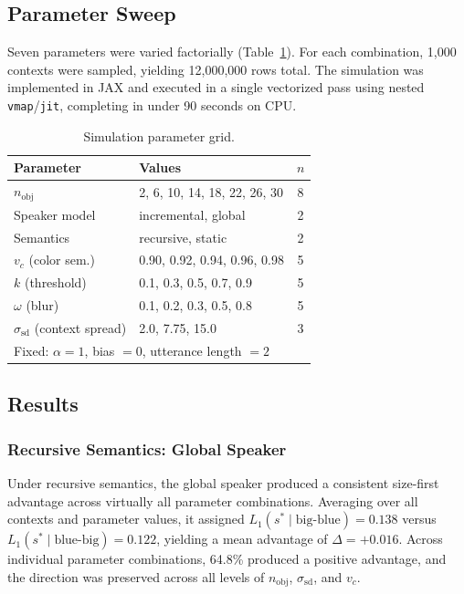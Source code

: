 \subsection{Parameter Sweep}

Seven parameters were varied factorially (Table~\ref{tab:params}).
For each combination, 1{,}000 contexts were sampled, yielding
12{,}000{,}000 rows total.
The simulation was implemented in JAX \citep{jax2018github} and executed
in a single vectorized pass using nested \texttt{vmap}/\texttt{jit},
completing in under 90 seconds on CPU.

\begin{table}[h]
\centering
\small
\caption{Simulation parameter grid.}
\label{tab:params}
\begin{tabular}{llc}
\toprule
Parameter & Values & $n$ \\
\midrule
$n_{\text{obj}}$    & 2, 6, 10, 14, 18, 22, 26, 30 & 8 \\
Speaker model       & incremental, global           & 2 \\
Semantics           & recursive, static             & 2 \\
$v_c$ (color sem.)  & 0.90, 0.92, 0.94, 0.96, 0.98 & 5 \\
$k$ (threshold)     & 0.1, 0.3, 0.5, 0.7, 0.9      & 5 \\
$\omega$ (blur)     & 0.1, 0.2, 0.3, 0.5, 0.8      & 5 \\
$\sigma_{\text{sd}}$ (context spread) & 2.0, 7.75, 15.0 & 3 \\
\midrule
\multicolumn{2}{l}{Fixed: $\alpha = 1$, bias $= 0$, utterance length $= 2$} & \\
\bottomrule
\end{tabular}
\end{table}

\subsection{Results}

\subsubsection{Recursive Semantics: Global Speaker}

Under recursive semantics, the global speaker produced a consistent
size-first advantage across virtually all parameter combinations.
Averaging over all contexts and parameter values, it assigned
$L_1(s^* \mid \text{big-blue}) = 0.138$ versus
$L_1(s^* \mid \text{blue-big}) = 0.122$,
yielding a mean advantage of $\Delta = +0.016$.
Across individual parameter combinations, 64.8\% produced a positive
advantage, and the direction was preserved across all levels of
$n_{\text{obj}}$, $\sigma_{\text{sd}}$, and $v_c$.

